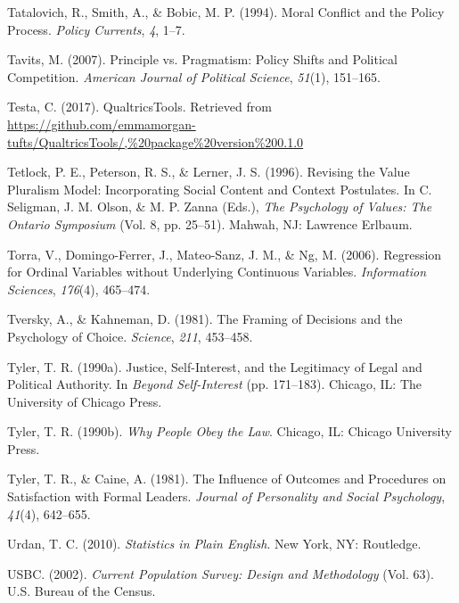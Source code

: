 \documentclass[12pt,econ]{sources/authesis}
\begin{document}
\leavevmode\hypertarget{ref-tatalovich_moral_1994}{}%
Tatalovich, R., Smith, A., \& Bobic, M. P. (1994). Moral Conflict and the Policy Process. \emph{Policy Currents}, \emph{4}, 1--7.

\leavevmode\hypertarget{ref-tavits_2007_principle}{}%
Tavits, M. (2007). Principle vs. Pragmatism: Policy Shifts and Political Competition. \emph{American Journal of Political Science}, \emph{51}(1), 151--165.

\leavevmode\hypertarget{ref-testa_2017_qualtricstools}{}%
Testa, C. (2017). QualtricsTools. Retrieved from \url{https://github.com/emmamorgan-tufts/QualtricsTools/,\%20package\%20version\%200.1.0}

\leavevmode\hypertarget{ref-tetlock_1996_revising}{}%
Tetlock, P. E., Peterson, R. S., \& Lerner, J. S. (1996). Revising the Value Pluralism Model: Incorporating Social Content and Context Postulates. In C. Seligman, J. M. Olson, \& M. P. Zanna (Eds.), \emph{The Psychology of Values: The Ontario Symposium} (Vol. 8, pp. 25--51). Mahwah, NJ: Lawrence Erlbaum.

\leavevmode\hypertarget{ref-torra_2006_regression}{}%
Torra, V., Domingo-Ferrer, J., Mateo-Sanz, J. M., \& Ng, M. (2006). Regression for Ordinal Variables without Underlying Continuous Variables. \emph{Information Sciences}, \emph{176}(4), 465--474.

\leavevmode\hypertarget{ref-tversky_framing_1981}{}%
Tversky, A., \& Kahneman, D. (1981). The Framing of Decisions and the Psychology of Choice. \emph{Science}, \emph{211}, 453--458.

\leavevmode\hypertarget{ref-tyler_justice_1990}{}%
Tyler, T. R. (1990a). Justice, Self-Interest, and the Legitimacy of Legal and Political Authority. In \emph{Beyond Self-Interest} (pp. 171--183). Chicago, IL: The University of Chicago Press.

\leavevmode\hypertarget{ref-tyler_1990_people}{}%
Tyler, T. R. (1990b). \emph{Why People Obey the Law}. Chicago, IL: Chicago University Press.

\leavevmode\hypertarget{ref-tyler_1981_influence}{}%
Tyler, T. R., \& Caine, A. (1981). The Influence of Outcomes and Procedures on Satisfaction with Formal Leaders. \emph{Journal of Personality and Social Psychology}, \emph{41}(4), 642--655.

\leavevmode\hypertarget{ref-urdan_statistics_2010}{}%
Urdan, T. C. (2010). \emph{Statistics in Plain English}. New York, NY: Routledge.

\leavevmode\hypertarget{ref-census_2002_current}{}%
USBC. (2002). \emph{Current Population Survey: Design and Methodology} (Vol. 63). U.S. Bureau of the Census.
\end{document}
